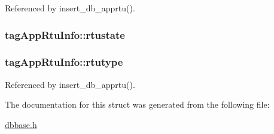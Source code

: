 Referenced by insert\-\_\-db\-\_\-apprtu().

\hypertarget{structtagAppRtuInfo_a9fed15b73bfbfe8b1b2e0d125044f38c}{
\subsubsection[{rtustate}]{ tag\-App\-Rtu\-Info\-::rtustate}}\label{structtagAppRtuInfo_a9fed15b73bfbfe8b1b2e0d125044f38c}
\hypertarget{structtagAppRtuInfo_a7a0f5b530b144daff9442a2e6bb20fb5}{
\subsubsection[{rtutype}]{ tag\-App\-Rtu\-Info\-::rtutype}}\label{structtagAppRtuInfo_a7a0f5b530b144daff9442a2e6bb20fb5}


Referenced by insert\-\_\-db\-\_\-apprtu().



The documentation for this struct was generated from the following file\-:\begin{DoxyCompactItemize}
\item 
\hyperlink{dbbase_8h}{dbbase.\-h}\end{DoxyCompactItemize}
